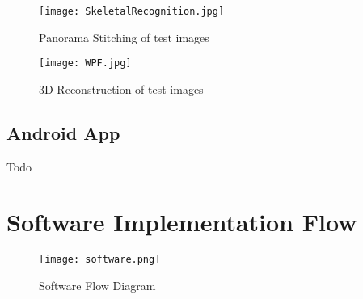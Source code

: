\begin{figure}[H]
  \centering
  \texttt{[image: SkeletalRecognition.jpg]}
  \caption{Panorama Stitching of test images}
  \label{pano}	
\end{figure}

\begin{figure}[H]
  \centering
  \texttt{[image: WPF.jpg]}
  \caption{3D Reconstruction of test images}
  \label{recon}	
\end{figure}

\subsection{Android App}
Todo

\section{Software Implementation Flow}

\begin{figure}[H]
  \centering
  \texttt{[image: software.png]}
  \caption{Software Flow Diagram}
  \label{Software Flow}	
\end{figure}


